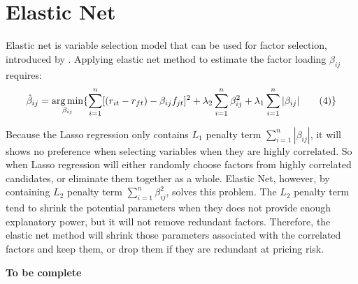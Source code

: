 \section{Elastic Net}

Elastic net  is variable selection model that can be used for factor selection, introduced by . Applying elastic net method to estimate the factor loading $\beta_{ij}$ requires:
	\[   \hat{\beta}_{ij}  = \operatorname*{arg\,min}_{\beta_{ij}}\{\sum_{i = 1}^{n}[(r_{it} - r_{ft}) - \beta_{ij }f_{jt}]^2 + \lambda_2\sum_{i = 1}^{n}\beta_{ij}^2  + \lambda_1\sum_{i = 1}^{n}|\beta_{ij}|  \label{ENcriterion} \tag{4}   \}    \]
	
	
	
Because the Lasso regression only contains $L_1$ penalty term $\sum_{i = 1}^{n} |\beta_{ij}|$, it will shows no preference when selecting variables when they are highly correlated.
So when Lasso regression will either randomly choose factors from highly correlated candidates, or eliminate them together as a whole.  
Elastic Net, however, by containing $L_2$ penalty term $\sum_{i=1}^{n}\beta_{ij}^2$, solves this problem. 
The $L_2$ penalty term tend to shrink the potential parameters when they does not provide enough explanatory power, but it will not remove redundant factors.
Therefore, the elastic net method will shrink those parameters associated with the correlated factors and keep them, or drop them if they are redundant at pricing risk. 
	
{\bf To be complete}